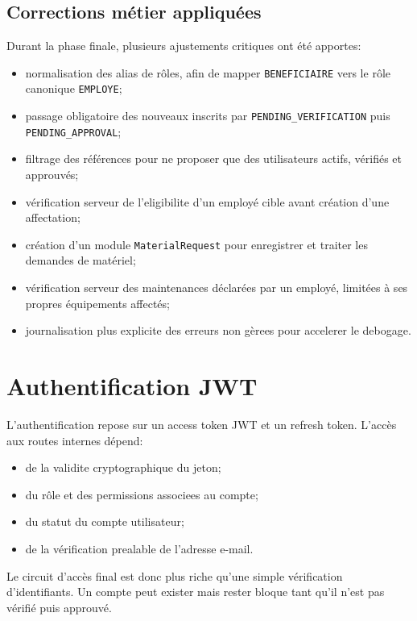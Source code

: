 \subsection{Corrections métier appliquées}
Durant la phase finale, plusieurs ajustements critiques ont été apportes:
\begin{itemize}
  \item normalisation des alias de rôles, afin de mapper \texttt{BENEFICIAIRE} vers le rôle canonique \texttt{EMPLOYE};
  \item passage obligatoire des nouveaux inscrits par \texttt{PENDING\_VERIFICATION} puis \texttt{PENDING\_APPROVAL};
  \item filtrage des références pour ne proposer que des utilisateurs actifs, vérifiés et approuvés;
  \item vérification serveur de l'eligibilite d'un employé cible avant création d'une affectation;
  \item création d'un module \texttt{MaterialRequest} pour enregistrer et traiter les demandes de matériel;
  \item vérification serveur des maintenances déclarées par un employé, limitées à ses propres équipements affectés;
  \item journalisation plus explicite des erreurs non gèrees pour accelerer le debogage.
\end{itemize}

\section{Authentification JWT}
L'authentification repose sur un access token JWT et un refresh token. L'accès aux routes internes dépend:
\begin{itemize}
  \item de la validite cryptographique du jeton;
  \item du rôle et des permissions associees au compte;
  \item du statut du compte utilisateur;
  \item de la vérification prealable de l'adresse e-mail.
\end{itemize}

Le circuit d'accès final est donc plus riche qu'une simple vérification d'identifiants. Un compte peut exister mais rester bloque tant qu'il n'est pas vérifié puis approuvé.

